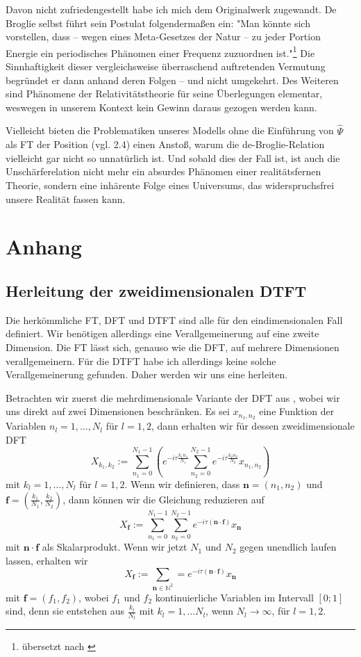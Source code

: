 \documentclass[a4paper,12pt,ngerman]{scrartcl}
\theoremstyle{plain}
\theoremstyle{plain}
\theoremstyle{plain}
\theoremstyle{plain}
\newcommand{\N}{\mathbb{N}}
\begin{document}
Davon nicht zufriedengestellt habe ich mich dem Originalwerk \cite{broglie} zugewandt. De Broglie selbst führt sein Postulat folgendermaßen ein: "Man könnte sich vorstellen, dass -- wegen eines Meta-Gesetzes der Natur -- zu jeder Portion Energie ein periodisches Phänomen einer Frequenz zuzuordnen ist."\footnote{übersetzt nach \cite[S.9]{broglie}} Die Sinnhaftigkeit dieser vergleichsweise überraschend auftretenden Vermutung begründet er dann anhand deren Folgen -- und nicht umgekehrt. Des Weiteren sind Phänomene der Relativitätstheorie für seine Überlegungen elementar, weswegen in unserem Kontext kein Gewinn daraus gezogen werden kann.

Vielleicht bieten die Problematiken unseres Modells ohne die Einführung von $\widehat{\Psi}$ als FT der Position (vgl. 2.4) einen Anstoß, warum die de-Broglie-Relation vielleicht gar nicht so unnatürlich ist. Und sobald dies der Fall ist, ist auch die Unschärferelation nicht mehr ein absurdes Phänomen einer realitätsfernen Theorie, sondern eine inhärente Folge eines Universums, das widerspruchsfrei unsere Realität fassen kann. 

\clearpage

\section{Anhang}

\subsection{Herleitung der zweidimensionalen DTFT}

Die herkömmliche FT, DFT und DTFT sind alle für den eindimensionalen Fall definiert. Wir benötigen allerdings eine Verallgemeinerung auf eine zweite Dimension. Die FT lässt sich, genauso wie die DFT, auf mehrere Dimensionen verallgemeinern. Für die DTFT habe ich allerdings keine solche Verallgemeinerung gefunden. Daher werden wir uns eine herleiten.

Betrachten wir zuerst die mehrdimensionale Variante der DFT aus \cite{wiki:dft}, wobei wir uns direkt auf zwei Dimensionen beschränken. Es sei $x_{n_1,n_2}$ eine Funktion der Variablen $n_l = 1, \dots, N_l$ für $l=1, 2$, dann erhalten wir für dessen zweidimensionale DFT
\[X_{k_1,k_2}:=\sum^{N_1-1}_{n_1=0} \left(e^{-i\tau\frac{k_1n_1}{N_1}}
\sum^{N_2-1}_{n_2=0}e^{-i\tau\frac{k_2n_2}{N_2}}x_{n_1,n_2}\right)\]
mit $k_l = 1,\dots,N_l$ für $l=1,2$. Wenn wir definieren, dass $\pmb{n}=(n_1,n_2)$ und $\pmb{f}=\left(\frac{k_1}{N_1},\frac{k_2}{N_2}\right)$, dann können wir die Gleichung reduzieren auf
\[X_{\pmb{f}}:=\sum^{N_1-1}_{n_1=0}\sum^{N_2-1}_{n_2=0}e^{-i\tau(\pmb{n}\cdot\pmb{f})}x_{\pmb{n}}\]
mit $\pmb{n}\cdot\pmb{f}$ als Skalarprodukt. Wenn wir jetzt $N_1$ und $N_2$ gegen unendlich laufen lassen, erhalten wir
\[X_{\pmb{f}}:=\sum_{\pmb{n}\in\N^2}=e^{-i\tau(\pmb{n}\cdot\pmb{f})}x_{\pmb{n}}\]
mit $\pmb{f}=(f_1,f_2)$, wobei $f_1$ und $f_2$ kontinuierliche Variablen im Intervall $[0;1]$ sind, denn sie entstehen aus $\frac{k_l}{N_l}$ mit $k_l=1,\dots N_l$, wenn $N_l\rightarrow\infty$, für $l=1,2$.
\end{document}
